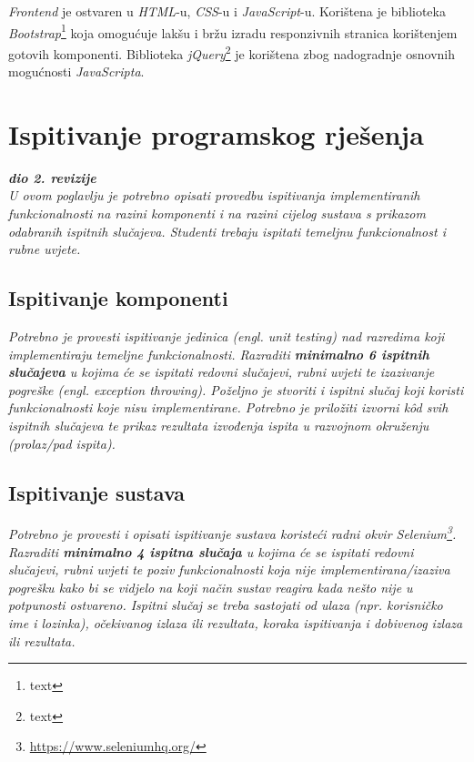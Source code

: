 		\textit{Frontend} je ostvaren u \textit{HTML}-u, \textit{CSS}-u i \textit{JavaScript}-u. Korištena je biblioteka \textit{Bootstrap}\footnote{text} koja omogućuje lakšu i bržu izradu responzivnih stranica korištenjem gotovih komponenti. Biblioteka \textit{jQuery}\footnote{text} je korištena zbog nadogradnje osnovnih mogućnosti \textit{JavaScripta}.
			
			\eject 
		
	
		\section{Ispitivanje programskog rješenja}
			
			\textbf{\textit{dio 2. revizije}}\\
			
			 \textit{U ovom poglavlju je potrebno opisati provedbu ispitivanja implementiranih funkcionalnosti na razini komponenti i na razini cijelog sustava s prikazom odabranih ispitnih slučajeva. Studenti trebaju ispitati temeljnu funkcionalnost i rubne uvjete.}
	
			
			\subsection{Ispitivanje komponenti}
			\textit{Potrebno je provesti ispitivanje jedinica (engl. unit testing) nad razredima koji implementiraju temeljne funkcionalnosti. Razraditi \textbf{minimalno 6 ispitnih slučajeva} u kojima će se ispitati redovni slučajevi, rubni uvjeti te izazivanje pogreške (engl. exception throwing). Poželjno je stvoriti i ispitni slučaj koji koristi funkcionalnosti koje nisu implementirane. Potrebno je priložiti izvorni kôd svih ispitnih slučajeva te prikaz rezultata izvođenja ispita u razvojnom okruženju (prolaz/pad ispita). }
			
			
			
			\subsection{Ispitivanje sustava}
			
			 \textit{Potrebno je provesti i opisati ispitivanje sustava koristeći radni okvir Selenium\footnote{\url{https://www.seleniumhq.org/}}. Razraditi \textbf{minimalno 4 ispitna slučaja} u kojima će se ispitati redovni slučajevi, rubni uvjeti te poziv funkcionalnosti koja nije implementirana/izaziva pogrešku kako bi se vidjelo na koji način sustav reagira kada nešto nije u potpunosti ostvareno. Ispitni slučaj se treba sastojati od ulaza (npr. korisničko ime i lozinka), očekivanog izlaza ili rezultata, koraka ispitivanja i dobivenog izlaza ili rezultata.\\ }
			 
